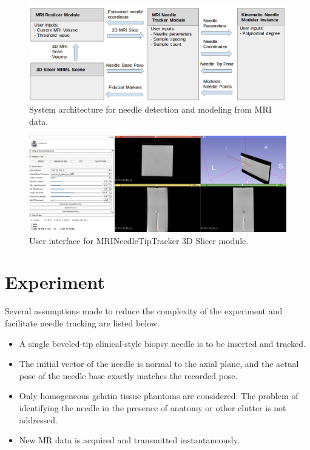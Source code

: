 \begin{figure}[h]
\includegraphics[width=1.0\textwidth]{Fig/chap5/MRI_software_architecture.png}
\caption{System architecture for needle detection and modeling from MRI data.}
\label{fig:MRI_architecture}
\end{figure}

\begin{figure}[h]
\includegraphics[width=1.0\textwidth]{Fig/chap5/MRINeedleTipTracker_module.png}
\caption{User interface for MRINeedleTipTracker 3D Slicer module.}
\label{fig:slicer_gui}
\end{figure}

\section{Experiment}

Several assumptions made to reduce the complexity of the experiment and facilitate needle tracking are listed below.

\begin{itemize}
\item A single beveled-tip clinical-style biopsy needle is to be inserted and tracked.
\item The initial vector of the needle is normal to the axial plane, and the actual pose of the needle base exactly matches the recorded pose.
\item Only homogeneous gelatin tissue phantoms are considered. The problem of identifying the needle in the presence of anatomy or other clutter is not addressed.
\item New MR data is acquired and transmitted instantaneously.
\end{itemize}

